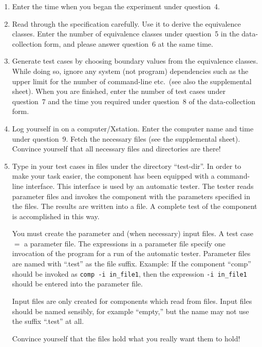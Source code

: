 \begin{enumerate}
\addtocounter{enumi}{1}

\item Enter the time when you began the experiment under question~4.

\item Read through the specification carefully.
Use it to derive the equivalence classes.
Enter the number of equivalence classes under question~5 in the
data-collection form, and please answer question~6 at the same time.

\item Generate test cases by choosing boundary values from the
equivalence classes.
While doing so, ignore any system (not program) dependencies such as
the upper limit for the number of command-line etc.~(see also the
supplemental sheet). 
When you are finished, enter the number of test cases under question~7
and the time you required under question~8 of the data-collection form.

\item Log yourself in on a computer/Xstation.  Enter the computer name
and time under question~9.
Fetch the necessary files (see the supplemental sheet).
Convince yourself that all necessary files and directories are there!

\item Type in your test cases in files under the directory ``test-dir''.
In order to make your task easier, the component has been equipped
with a command-line interface.
This interface is used by an automatic tester.  The tester reads 
parameter files and invokes the component with the parameters
specified in the files.
The results are written into a file.
A complete test of the component is accomplished in this way.

You must create the parameter and (when necessary) input files.
A test case $=$ a parameter file.
The expressions in a parameter file specify one invocation of the
program for a run of the automatic tester.
Parameter files are named with ``.test'' as the file suffix.
Example: If the component ``comp'' should be invoked as {\tt comp -i
in\_file1}, then the expression {\tt -i in\_file1} should be entered
into the parameter file.

Input files are only created for components which read from files.
Input files should be named sensibly, for example ``empty,'' but the
name may not use the suffix ``.test'' at all.

Convince yourself that the files hold what you really want them to
hold!

\end{enumerate}

